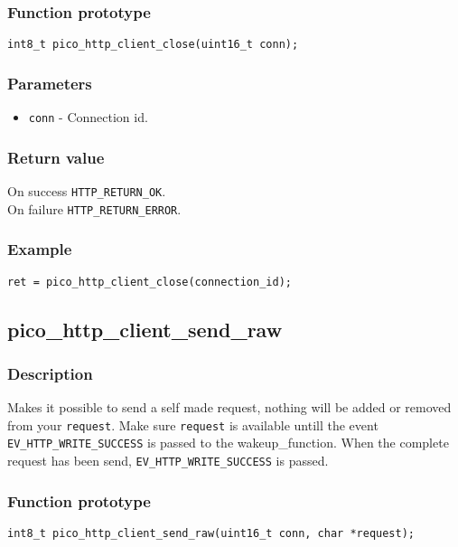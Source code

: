 \subsubsection*{Function prototype}
\texttt{int8\_t pico\_http\_client\_close(uint16\_t conn);}

\subsubsection*{Parameters}
\begin{itemize}[noitemsep]
\item \texttt{conn} - Connection id.
\end{itemize}
\subsubsection*{Return value}
On success \texttt{HTTP\_RETURN\_OK}.
\\On failure \texttt{HTTP\_RETURN\_ERROR}.
\subsubsection*{Example}
\begin{verbatim}
ret = pico_http_client_close(connection_id);
\end{verbatim}


\subsection{pico\_http\_client\_send\_raw}

\subsubsection*{Description}
Makes it possible to send a self made request, nothing will be added or removed from your \texttt{request}.
Make sure \texttt{request} is available untill the event \texttt{EV\_HTTP\_WRITE\_SUCCESS} is passed to the wakeup\_function. When the complete request has been send, \texttt{EV\_HTTP\_WRITE\_SUCCESS} is passed.

\subsubsection*{Function prototype}
\texttt{int8\_t pico\_http\_client\_send\_raw(uint16\_t conn, char *request);}

